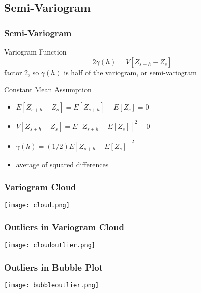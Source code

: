 \documentclass[nototal,handout]{beamer}
\begin{document}
 \subsection{Semi-Variogram}
 \begin{frame}
   \frametitle{Semi-Variogram}
   \begin{block}{Variogram Function}
     \begin{equation}
       2 \gamma(h) = V [Z_{s+h} - Z_s ]
     \end{equation}
     factor 2, so $\gamma(h)$ is half of the variogram, or semi-variogram
    \end{block}
    \begin{block}{Constant Mean Assumption}
      \begin{itemize}
	\item $E[Z_{s+h} - Z_s] = E[Z_{s+h}] - E[Z_s] = 0$
	\item $V[Z_{s+h} - Z_s] = E[Z_{s+h} - E[Z_s]]^2 - 0$
	\item $\gamma(h) = (1/2) E[Z_{s+h} - E[Z_s]]^2$
	\item average of squared differences
      \end{itemize}

    \end{block}
  \end{frame}

\begin{frame}[<+->]
  \frametitle{Variogram Cloud}
    \begin{center}
      \texttt{[image: cloud.png]}
    \end{center}
 \end{frame}

\begin{frame}[<+->]
  \frametitle{Outliers in Variogram Cloud}
    \begin{center}
      \texttt{[image: cloudoutlier.png]}
    \end{center}
 \end{frame}


\begin{frame}[<+->]
  \frametitle{Outliers in Bubble Plot}
    \begin{center}
      \texttt{[image: bubbleoutlier.png]}
    \end{center}
 \end{frame}
\end{document}
